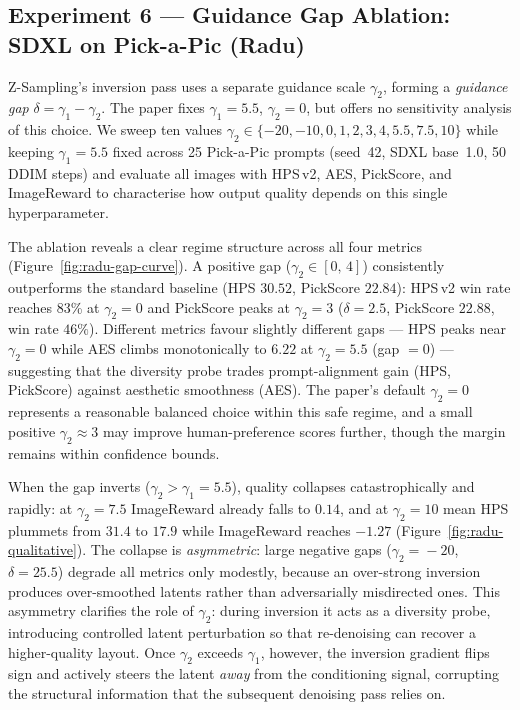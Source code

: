 \FloatBarrier
\subsection*{Experiment 6 --- Guidance Gap Ablation: SDXL on Pick-a-Pic (Radu)}

Z-Sampling's inversion pass uses a separate guidance scale $\gamma_2$, forming
a \emph{guidance gap} $\delta = \gamma_1 - \gamma_2$. The paper fixes
$\gamma_1 = 5.5$, $\gamma_2 = 0$, but offers no sensitivity analysis of this
choice. We sweep ten values $\gamma_2 \in \{-20, -10, 0, 1, 2, 3, 4, 5.5, 7.5, 10\}$
while keeping $\gamma_1 = 5.5$ fixed across 25 Pick-a-Pic prompts (seed~42,
SDXL base~1.0, 50 DDIM steps) and evaluate all images with HPS\,v2, AES,
PickScore, and ImageReward to characterise how output quality depends on this
single hyperparameter.

The ablation reveals a clear regime structure across all four metrics
(Figure~\ref{fig:radu-gap-curve}). A positive gap ($\gamma_2 \in [0,\,4]$)
consistently outperforms the standard baseline (HPS $30.52$, PickScore $22.84$):
HPS\,v2 win rate reaches 83\% at $\gamma_2\!=\!0$ and PickScore peaks at
$\gamma_2\!=\!3$ ($\delta\!=\!2.5$, PickScore $22.88$, win rate $46\%$).
Different metrics favour slightly different gaps --- HPS peaks near $\gamma_2\!=\!0$
while AES climbs monotonically to $6.22$ at $\gamma_2\!=\!5.5$ (gap $= 0$) ---
suggesting that the diversity probe trades prompt-alignment gain (HPS, PickScore)
against aesthetic smoothness (AES). The paper's default $\gamma_2\!=\!0$
represents a reasonable balanced choice within this safe regime, and a small
positive $\gamma_2 \approx 3$ may improve human-preference scores further,
though the margin remains within confidence bounds.

When the gap inverts ($\gamma_2 > \gamma_1\!=\!5.5$), quality collapses
catastrophically and rapidly: at $\gamma_2\!=\!7.5$ ImageReward already falls
to $0.14$, and at $\gamma_2\!=\!10$ mean HPS plummets from $31.4$ to $17.9$
while ImageReward reaches $-1.27$ (Figure~\ref{fig:radu-qualitative}). The
collapse is \emph{asymmetric}: large negative gaps ($\gamma_2\!=\!-20$,
$\delta\!=\!25.5$) degrade all metrics only modestly, because an over-strong
inversion produces over-smoothed latents rather than adversarially misdirected
ones. This asymmetry clarifies the role of $\gamma_2$: during inversion it acts
as a diversity probe, introducing controlled latent perturbation so that
re-denoising can recover a higher-quality layout. Once $\gamma_2$ exceeds
$\gamma_1$, however, the inversion gradient flips sign and actively steers the
latent \emph{away} from the conditioning signal, corrupting the structural
information that the subsequent denoising pass relies on.

